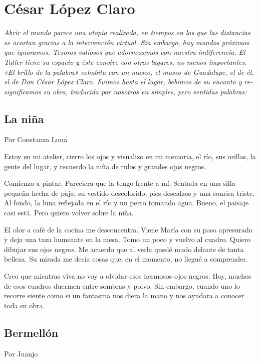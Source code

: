 \documentclass[11pt,twoside,openright,a5paper]{book}
\begin{document}
\chapter*{César López Claro}
\vspace{0.5cm}
\emph{Abrir el mundo parece una utopía realizada, en tiempos en los que las distancias se acortan gracias a la intervención virtual.
Sin embargo, hay mundos próximos que ignoramos. Tesoros valiosos que adormecemos con nuestra indiferencia.
El Taller tiene su espacio y éste convive con otros lugares, no menos importantes.
«El brillo de la palabra» cohabita con un museo, el museo de Guadalupe, el de él, el de Don César López Claro. 
Fuimos hasta el lugar, bebimos de su encanto y re-significamos su obra, traducida por nosotros en simples, pero sentidas palabras:}

\section*{La niña}
                                                                                                     \begin{flushright}Por Constanza Luna\end{flushright}

Estoy en mi atelier, cierro los ojos y visualizo en mi memoria, el río, sus orillas, la gente del lugar, y recuerdo la niña de rulos y grandes ojos negros.

Comienzo a pintar. Pareciera que la tengo frente a mí. Sentada en una silla pequeña hecha de paja; su vestido descolorido, pies descalzos y una sonrisa triste. Al fondo, la luna reflejada en el río y un perro tomando agua. Bueno, el paisaje casi está. Pero quiero volver sobre la niña.

El olor a café de la cocina me desconcentra. Viene María con su paso apresurado y deja una taza humeante en la mesa. Tomo un poco y vuelvo al cuadro. Quiero dibujar sus ojos negros. Me acuerdo que al verla quedé mudo delante de tanta belleza. Su mirada me decía cosas que, en el momento, no llegué a comprender. 

Creo que mientras viva no voy a olvidar esos hermosos ojos negros.
Hoy, muchos de esos cuadros duermen entre sombras y polvo. Sin embargo, cuando uno lo recorre siente como si un fantasma nos diera la mano y nos ayudara a conocer toda su obra.

\section*{Bermellón}
                                                                                                        \begin{flushright}Por Juanjo\end{flushright}
\end{document}
